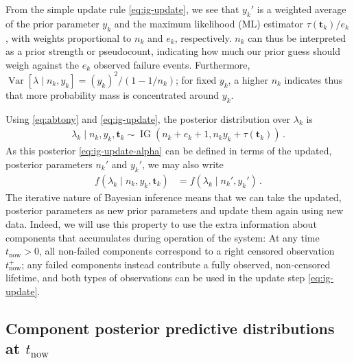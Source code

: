\documentclass[authoryear]{elsarticle}
\renewcommand{\vec}[1]{{\bm#1}}
\newcommand{\uz}{^{(0)}} %
\newcommand{\V}{\operatorname{Var}}
\newcommand{\ig}{\operatorname{IG}}   %
\def\ykz{y\uz_k}
\def\nkz{n\uz_k}
\newcommand{\nk}{n_k}
\newcommand{\nkp}{n_k'}
\newcommand{\yk}{y_k}
\newcommand{\ykp}{y_k'}
\def\tautk{\tau(\vec{t}_k)}
\def\tnow{t_\text{now}}
\def\tpnow{t^+_\text{now}}
\begin{document}
From the simple update rule \eqref{eq:ig-update}, we see that
$\ykp$ is a weighted average of the prior parameter $\yk$ and the maximum likelihood (ML) estimator $\tautk/e_k$,
with weights proportional to $\nk$ and $e_k$, respectively.
$\nk$ can thus be interpreted as a prior strength or pseudocount,
indicating how much our prior guess should weigh against the $e_k$ observed failure events.
Furthermore, $\V[\lambda\mid\nk,\yk] = (\yk)^2 / (1 - 1/\nk)$;
for fixed $\yk$, a higher $\nk$ indicates thus 
that more probability mass is concentrated around $\yk$.

Using \eqref{eq:abtony} and \eqref{eq:ig-update}, the posterior distribution over $\lambda_k$ is
\begin{align}
\lambda_k \mid \nk, \yk, \vec{t}_k \sim \ig(\nk + e_k + 1, \nk \yk + \tautk)\,.
\label{eq:ig-update-alpha}
\end{align}
As this posterior \eqref{eq:ig-update-alpha} can be defined in terms of
the updated, posterior parameters $\nkp$ and $\ykp$,
we may also write
\begin{align*}
f(\lambda_k \mid \nk, \yk, \vec{t}_k) &= f(\lambda_k \mid \nkp, \ykp)\,.
\end{align*}
The iterative nature of Bayesian inference means that we can take the updated,
posterior parameters as new prior parameters and update them again using new data.
Indeed, we will use this property to use the extra information about components
that accumulates during operation of the system:
At any time $\tnow > 0$,
all non-failed components correspond to a right censored observation $\tpnow$;
any failed components instead contribute a fully observed, non-censored lifetime,
and both types of observations can be used in the update step \eqref{eq:ig-update}.



\subsection{Component posterior predictive distributions at $\tnow$}
\label{sec:postpred}
\end{document}
